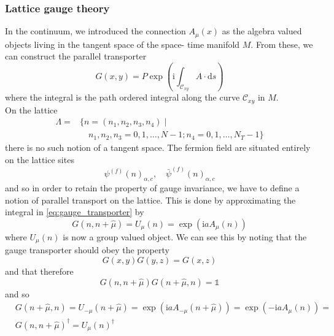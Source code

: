 \documentclass[a4paper,10pt]{article}
\begin{document}
\subsubsection{Lattice gauge theory}
In the continuum, we introduced the connection $A_\mu(x)$ as the algebra valued objects living in the tangent space of the space- time manifold $M$. From these, we can construct the parallel transporter
\begin{equation}\label{eq:gauge_transporter}
G(x, y)=P \exp \left(\mathrm{i} \int_{\mathcal{C}_{x y}} A \cdot \mathrm{d} s\right)
\end{equation}
where the integral is the path ordered integral along the curve $\mathcal{C}_{x y}$ in $M$.\\On the lattice
\begin{equation}
\begin{aligned}
\Lambda=&\{n=\left(n_{1}, n_{2}, n_{3}, n_{4}\right) \mid \\
&\quad n_{1}, n_{2}, n_{3}=0,1, \ldots, N-1 ; n_{4}=0,1, \ldots, N_{T}-1\}
\end{aligned}
\end{equation}
there is no such notion of a tangent space. The fermion field are situated entirely on the lattice sites
\begin{equation}
\psi^{(f)}(n)_{\alpha, c}, \quad \bar{\psi}^{(f)}(n)_{\alpha, c}
\end{equation}
and so in order to retain the property of gauge invariance, we have to define a notion of parallel transport on the lattice. This is done by approximating the integral in \eqref{eq:gauge_transporter} by
\begin{equation}\label{eq:linkVariable_exponential}
G(n,n+\hat{\mu}) = U_{\mu}(n)=\exp \left(\mathrm{i} a A_{\mu}(n)\right)
\end{equation}
where $U_{\mu}(n)$ is now a group valued object. We can see this by noting that the gauge transporter should obey the property
\begin{equation}
G(x,y)G(y,z) = G(x,z)
\end{equation}
and that therefore 
\begin{equation}
G(n,n+\hat{\mu})G(n+\hat{\mu},n) = \mathbb{1}
\end{equation}
and so
\begin{equation}
\begin{aligned}
&G(n+\hat{\mu},n) = U_{-\mu}(n+\hat{\mu})=\exp \left(\mathrm{i} a A_{-\mu}(n+\hat{\mu})\right) = \exp \left(-\mathrm{i} a A_{\mu}(n)\right)=\\ &G(n,n+\hat{\mu})^\dagger = U_{\mu}(n)^\dagger
\end{aligned}
\end{equation}
\end{document}
